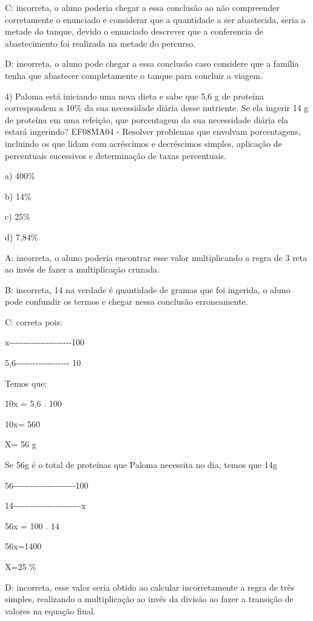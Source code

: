 C: incorreta, o aluno poderia chegar a essa conclusão ao não compreender
corretamente o enunciado e considerar que a quantidade a ser abastecida,
seria a metade do tanque, devido o enunciado descrever que a conferencia
de abastecimento foi realizada na metade do percurso.

D: incorreta, o aluno pode chegar a essa conclusão caso considere que a
família tenha que abastecer completamente o tanque para concluir a
viagem.

4) Paloma está iniciando uma nova dieta e sabe que 5,6 g de proteína
correspondem a 10\% da sua necessidade diária desse nutriente. Se ela
ingerir 14 g de proteína em uma refeição, que porcentagem da sua
necessidade diária ela estará ingerindo? EF08MA04 - Resolver problemas
que envolvam porcentagens, incluindo os que lidam com acréscimos e
decréscimos simples, aplicação de percentuais sucessivos e determinação
de taxas percentuais.

a) 400\%

b) 14\%

c) 25\%

d) 7,84\%

A: incorreta, o aluno poderia encontrar esse valor multiplicando a regra
de 3 reta ao invés de fazer a multiplicação cruzada.

B: incorreta, 14 na verdade é quantidade de gramas que foi ingerida, o
aluno pode confundir os termos e chegar nessa conclusão erroneamente.

C: correta pois:

x-\/-\/-\/-\/-\/-\/-\/-\/-\/-\/-\/-\/-\/-\/-\/-\/-\/-\/-\/-\/-\/-100

5,6-\/-\/-\/-\/-\/-\/-\/-\/-\/-\/-\/-\/-\/-\/-\/-\/-\/-\/- 10

Temos que:

10x = 5,6 . 100

10x= 560

X= 56 g

Se 56g é o total de proteínas que Paloma necessita no dia, temos que 14g

56-\/-\/-\/-\/-\/-\/-\/-\/-\/-\/-\/-\/-\/-\/-\/-\/-\/-\/-\/-\/-\/-100

14-\/-\/-\/-\/-\/-\/-\/-\/-\/-\/-\/-\/-\/-\/-\/-\/-\/-\/-\/-\/-\/-\/-\/-x

56x = 100 . 14

56x=1400

X=25 \%

D: incorreta, esse valor seria obtido ao calcular incorretamente a regra
de três simples, realizando a multiplicação ao invés da divisão ao fazer
a transição de valores na equação final.

